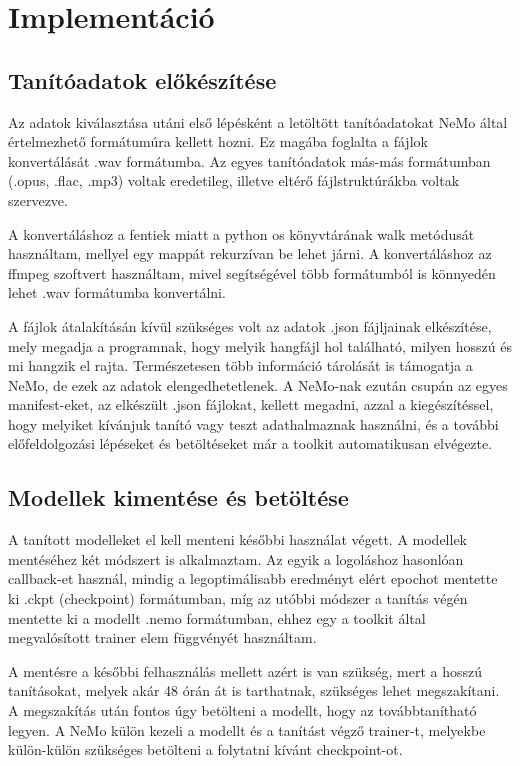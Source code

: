 \chapter{Implementáció}

\section{Tanítóadatok előkészítése}

Az adatok kiválasztása utáni első lépésként a letöltött tanítóadatokat NeMo által értelmezhető formátumúra kellett hozni. Ez magába foglalta a fájlok konvertálását .wav formátumba. Az egyes tanítóadatok más-más formátumban (.opus, .flac, .mp3) voltak eredetileg, illetve eltérő fájlstruktúrákba voltak szervezve.

A konvertáláshoz a fentiek miatt a python os könyvtárának walk metódusát használtam, mellyel egy mappát rekurzívan be lehet járni. A konvertáláshoz az ffmpeg szoftvert használtam, mivel segítségével több formátumból is könnyedén lehet .wav formátumba konvertálni.

A fájlok átalakításán kívül szükséges volt az adatok .json fájljainak elkészítése, mely megadja a programnak, hogy melyik hangfájl hol található, milyen hosszú és mi hangzik el rajta. Természetesen több információ tárolását is támogatja a NeMo, de ezek az adatok elengedhetetlenek. A NeMo-nak ezután csupán az egyes manifest-eket, az elkészült .json fájlokat, kellett megadni, azzal a kiegészítéssel, hogy melyiket kívánjuk tanító vagy teszt adathalmaznak használni, és a további előfeldolgozási lépéseket és betöltéseket már a toolkit automatikusan elvégezte.

\section{Modellek kimentése és betöltése}

A tanított modelleket el kell menteni későbbi használat végett. A modellek mentéséhez két módszert is alkalmaztam. Az egyik a logoláshoz hasonlóan callback-et használ, mindig a legoptimálisabb eredményt elért epochot mentette ki .ckpt (checkpoint) formátumban, míg az utóbbi módszer a tanítás végén mentette ki a modellt .nemo formátumban, ehhez egy a toolkit által megvalósított trainer elem függvényét használtam.

A mentésre a későbbi felhasználás mellett azért is van szükség, mert a hosszú tanításokat, melyek akár 48 órán át is tarthatnak, szükséges lehet megszakítani. A megszakítás után fontos úgy betölteni a modellt, hogy az továbbtanítható legyen. A NeMo külön kezeli a modellt és a tanítást végző trainer-t, melyekbe külön-külön szükséges betölteni a folytatni kívánt checkpoint-ot.

